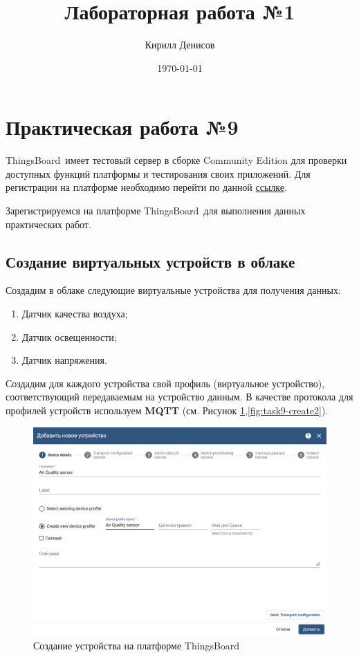 \documentclass[a4paper,14pt]{extarticle}
\author{Кирилл Денисов}
\title{Лабораторная работа №1}
\date{\today}
\newcommand{\pathToCommonFolder}{/home/denilai/Documents/repos/latex/Common}
\newcommand{\tb}{ThingsBoard~}
\begin{document}
	\thispagestyle{empty}
	
	\newpage
	\tableofcontents
	\newpage

\normalsize

\section{Практическая работа №9}

\tb имеет тестовый сервер в сборке Community Edition для проверки доступных
функций платформы и тестирования своих приложений. Для регистрации на платформе
необходимо перейти по данной  \href{https://demo.\tb.io/signup}{ссылке}.

Зарегистрируемся на платформе \tb для выполнения данных практических работ.

\subsection{Создание виртуальных устройств в облаке}

Создадим в облаке следующие виртуальные устройства для получения данных:


\begin{enumerate}
	\item Датчик качества воздуха;
	\item Датчик освещенности;
	\item Датчик напряжения.
\end{enumerate}

Создадим для каждого устройства свой профиль (виртуальное устройство), соответствующий передаваемым на
устройство данным. В качестве протокола для профилей устройств используем \textbf{MQTT} (см. Рисунок \ref{fig:task9-create},\ref{fig:task9-create2}).
\begin{figure}[h!]
	\centering
	\includegraphics[width=0.7\linewidth]{images/task9-create}
	\caption{Создание устройства на платформе \tb}
	\label{fig:task9-create}
\end{figure}
\end{document}
